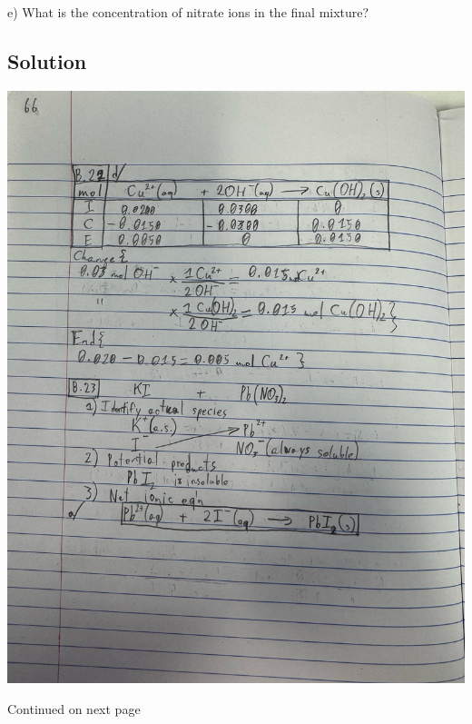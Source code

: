 \documentclass[10pt]{article}
\begin{document}
        e) What is the concentration of nitrate ions in the final mixture?

        \subsection{Solution}
            \begin{center}
                \includegraphics[width=\textwidth, trim={5in 13in 3in 26in},clip]{"Answers Images/IMG_6652.jpg"}
                
                Continued on next page


\end{center}
\end{document}

